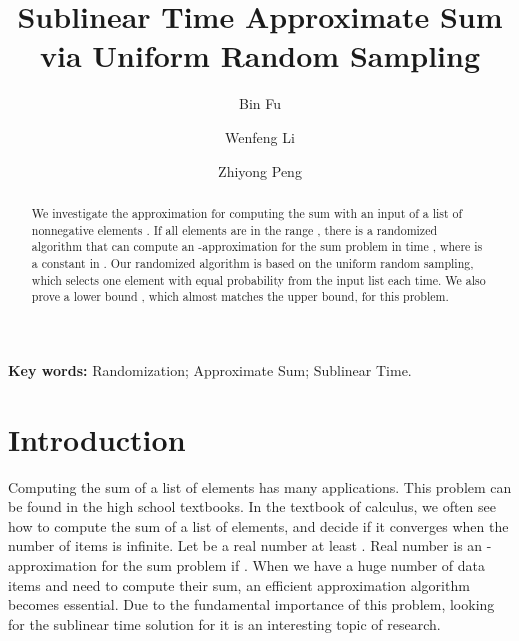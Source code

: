 \documentclass[runningheads]{llncs}
\begin{document}
\date{}


\title{Sublinear Time Approximate Sum via Uniform Random Sampling}
\author{Bin Fu\and Wenfeng Li \and Zhiyong Peng}
  \maketitle






\begin{abstract} We investigate the approximation for computing
the sum  with  an input of a list of nonnegative
elements . If all elements are in the range
, there is a randomized algorithm that can compute an
-approximation for the sum problem in time
, where  is a constant in . Our
randomized algorithm is based on the uniform random sampling, which
selects one element with equal probability from the input list each
time. We also prove a lower bound , which almost matches the upper bound, for this problem.
\end{abstract}



\centerline {{\bf Key words:}  Randomization;   Approximate Sum;
Sublinear Time.}

\section{Introduction}

Computing the sum of a list of elements has many applications. This
problem can be found in the high school textbooks. In the textbook
of calculus, we often see how to compute the sum of a list of
elements, and decide if it converges when the number of items is
infinite. Let  be a real number at least  . Real number
 is an -approximation for the sum problem
 if . When we have a huge number of data
items and need to compute their sum, an efficient approximation
algorithm becomes essential. Due to the fundamental importance of
this problem, looking for the sublinear time solution for it is an
interesting topic of research.
\end{document}
